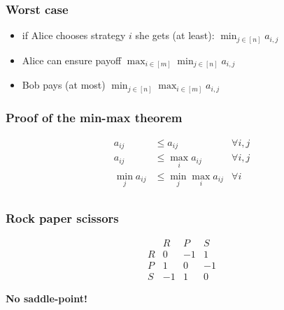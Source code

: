 \documentclass[aspectratio=149]{beamer}
\begin{document}
\begin{frame}
  \frametitle{Worst case}

  \begin{itemize}
    \item if Alice chooses strategy $i$ she gets (at least): $\min_{j\in [n]} a_{i,j}$
    \item Alice can ensure payoff $\max_{i\in [m]} \min_{j\in [n]} a_{i,j}$
    \item Bob pays (at most) $\min_{j\in [n]} \max_{i\in [m]} a_{i,j}$
  \end{itemize}
\end{frame}

\begin{frame}
  \frametitle{Proof of the min-max theorem}
  \begin{equation}
    \begin{aligned}
      a_{ij} &\le a_{ij} & \forall i,j \\
      a_{ij} &\le \max_i a_{ij} & \forall i,j\\
      \min_j a_{ij} &\le \min_j \max_i a_{ij} & \forall i\\
    \end{aligned}
  \end{equation}
\end{frame}


\begin{frame}
  \frametitle{Rock paper scissors}
  \begin{equation}
    \begin{array}{l|ccc}
        & R & P & S \\
      \hline
      R & 0 & -1 & 1 \\
      P & 1 & 0 & -1 \\
      S & -1 & 1 & 0
    \end{array}
  \end{equation}
  \begin{center}
    \textbf{No saddle-point!}
  \end{center}
  \vspace{1cm}

\end{frame}
\end{document}
